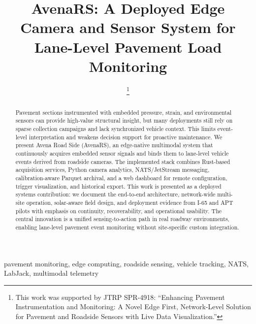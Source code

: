 \documentclass[conference]{IEEEtran}
\begin{document}
\title{AvenaRS: A Deployed Edge Camera and Sensor System for Lane-Level Pavement Load Monitoring}

\author{
\thanks{This work was supported by JTRP SPR-4918: ``Enhancing Pavement Instrumentation and Monitoring: A Novel Edge First, Network-Level Solution for Pavement and Roadside Sensors with Live Data Visualization.''}}

\maketitle

\begin{abstract}
Pavement sections instrumented with embedded pressure, strain, and environmental sensors can provide high-value structural insight, but many deployments still rely on sparse collection campaigns and lack synchronized vehicle context. This limits event-level interpretation and weakens decision support for proactive maintenance. We present Avena Road Side (AvenaRS), an edge-native multimodal system that continuously acquires embedded sensor signals and binds them to lane-level vehicle events derived from roadside cameras. The implemented stack combines Rust-based acquisition services, Python camera analytics, NATS/JetStream messaging, calibration-aware Parquet archival, and a web dashboard for remote configuration, trigger visualization, and historical export. This work is presented as a deployed systems contribution: we document the end-to-end architecture, network-wide multi-site operation, solar-aware field design, and deployment evidence from I-65 and APT pilots with emphasis on continuity, recoverability, and operational usability. The central innovation is a unified sensing-to-action path in real roadway environments, enabling lane-level pavement event monitoring without site-specific custom integration.
\end{abstract}

\begin{IEEEkeywords}
pavement monitoring, edge computing, roadside sensing, vehicle tracking, NATS, LabJack, multimodal telemetry
\end{IEEEkeywords}
\end{document}
